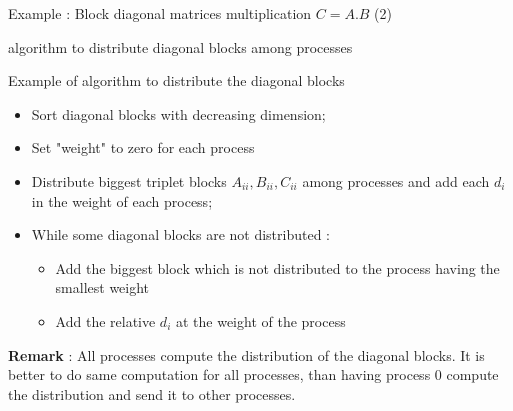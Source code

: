 \documentclass[compress,10pt,aspectratio=169]{beamer}
\begin{document}
\begin{frame}[fragile]{Example : Block diagonal matrices multiplication $C = A.B$ (2)}
    \scriptsize
    \begin{center}\small algorithm to distribute diagonal blocks among processes\end{center}

    \begin{block}{Example of algorithm to distribute the diagonal blocks}
    \begin{itemize}
        \item Sort diagonal blocks with decreasing dimension;
        \item Set "weight" to zero for each process
        \item Distribute biggest triplet blocks $A_{ii},B_{ii},C_{ii}$ among processes and add each $d_{i}$ in the weight of each process;
        \item While some diagonal blocks are not distributed :
        \begin{itemize}
            \item {\scriptsize Add the biggest block which is not distributed to the process having the smallest weight }
            \item {\scriptsize Add the relative $d_{i}$ at the weight of the process}
        \end{itemize}
    \end{itemize}
    \end{block}

    \textbf{Remark} : All processes compute the distribution of the diagonal blocks. It is better to do same computation for all processes,
                      than having process 0 compute the distribution and send it to other processes.

\end{frame}
\end{document}
